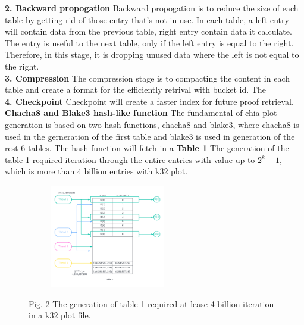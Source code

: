 \documentclass[sigconf, nonacm, natbib=false]{acmart}
\begin{document}
{\bf 2. Backward propogation}
Backward propogation is to reduce the size of each table by getting rid of those entry that's not in use. In each table, a left entry will contain data from the previous table, right entry contain data it calculate. The entry is useful to the next table, only if the left entry is equal to the right. Therefore, in this stage, it is dropping unused data where the left is not equal to the right. \\
{\bf 3. Compression}
The compression stage is to compacting the content in each table and create a format for the efficiently retrival with bucket id. The  \\
{\bf 4. Checkpoint}
Checkpoint will create a faster index for future proof retrieval. \\


{\bf Chacha8 and Blake3 hash-like function}
The fundamental of chia plot generation is based on two hash functions, chacha8 and blake3, where chacha8 is used in the gerneration of the first table and blake3 is used in generation of the rest 6 tables. The hash function will fetch in a 
{\bf Table 1}
The generation of the table 1 required iteration through the entire entries with value up to $2^{k} - 1$, which is more than 4 billion entries with k32 plot. 
\begin{figure}[ht]
\begin{center}
\includegraphics[height=4.5cm, width=7cm]{Speedy_Chia_Threading.png}
\end{center}
{\footnotesize Fig. 2 The generation of table 1 required at lease 4 billion iteration in a k32 plot file.}
\end{figure}
\end{document}
